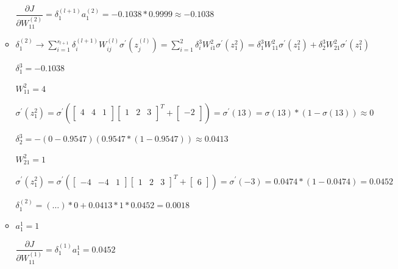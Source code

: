 \documentclass[12pt]{article}
\begin{document}
\begin{enumerate}[(a)]
\begin{itemize}
		$ \dfrac{\partial J}{\partial W_{11}^{(2)}} = \delta_{1}^{(l+1)} a_{1}^{(2)} = -0.1038 * 0.9999 \approx -0.1038 $
		
		\item $ \delta_{1}^{(2)} \rightarrow  \sum_{i=1}^{s_{l+1}} \delta_{i}^{(l+1)} W_{ij}^{(l)} \sigma^{\prime}\left(z_{j}^{(l)}\right) = \sum_{i=1}^{2} \delta_{i}^{3}W_{i1}^{2}\sigma^{\prime}\left(z_{1}^{2}\right) = \delta_{1}^{3}W_{11}^{2}\sigma^{\prime}\left(z_{1}^{2}\right) + \delta_{2}^{3}W_{21}^{2}\sigma^{\prime}\left(z_{1}^{2}\right)$\par
		$ \delta _{1}^{3} = -0.1038 $\par
		$ W_{11}^2 = 4 $\par
		$ \sigma^\prime \left(z_1^2\right) =  \sigma^\prime \left(
			\begin{bmatrix}
				4 & 4 & 1\\
			\end{bmatrix}\begin{bmatrix}
				1 & 2 & 3\\
			\end{bmatrix}^T + 
			\begin{bmatrix}
				-2\\
			\end{bmatrix}\right) = \sigma^\prime \left(13\right) =  \sigma(13) * (1-\sigma(13)) \approx 0$\par
		$ \delta^3_2 = -\left(0-0.9547\right) \left(0.9547 * (1-0.9547)\right) \approx 0.0413$\par
		$ W_{21}^2 = 1 $\par
		$ \sigma^\prime\left(z^2_1\right) = \sigma^\prime \left(
			\begin{bmatrix}
				-4 & -4 & 1
			\end{bmatrix}
			\begin{bmatrix}
				1 & 2 & 3
			\end{bmatrix}^T
			+ 
			\begin{bmatrix}
				6
			\end{bmatrix}
		\right) = \sigma^\prime (-3) = 0.0474 * (1-0.0474) = 0.0452$\par
		$ \delta_1^{(2)} = (\ldots) * 0 + 0.0413 * 1 * 0.0452 = 0.0018 $
		
		\item $ a_1^1 = 1 $\par		
		$ \dfrac{\partial J}{\partial W_{11}^{(1)}} = \delta_1^{(1)} a_1^{1} = 0.0452 $
	\end{itemize}
\end{enumerate}
\newpage
\end{document}
